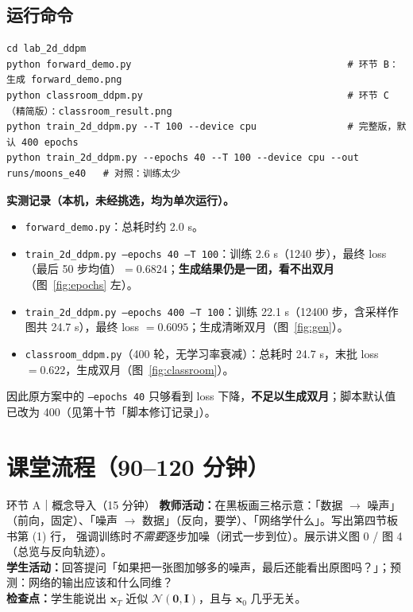 \documentclass[a4paper,fontset=none,zihao=5]{ctexart}
\newcommand{\x}{\mathbf{x}}
\newcommand{\I}{\mathbf{I}}
\newcommand{\N}{\mathcal{N}}
\newcommand{\code}[1]{\texttt{#1}}
\begin{document}
\subsection{运行命令}
\begin{lstlisting}[style=sh]
cd lab_2d_ddpm
python forward_demo.py                                      # 环节 B：生成 forward_demo.png
python classroom_ddpm.py                                    # 环节 C（精简版）：classroom_result.png
python train_2d_ddpm.py --T 100 --device cpu                # 完整版，默认 400 epochs
python train_2d_ddpm.py --epochs 40 --T 100 --device cpu --out runs/moons_e40   # 对照：训练太少
\end{lstlisting}

\begin{notebox}
\textbf{实测记录（本机，未经挑选，均为单次运行）。}
\begin{itemize}[leftmargin=1.4em,itemsep=0pt]
  \item \code{forward\_demo.py}：总耗时约 2.0 s。
  \item \code{train\_2d\_ddpm.py --epochs 40 --T 100}：训练 2.6 s（1240 步），最终 loss（最后 50 步均值）$=0.6824$；\textbf{生成结果仍是一团，看不出双月}（图~\ref{fig:epochs} 左）。
  \item \code{train\_2d\_ddpm.py --epochs 400 --T 100}：训练 22.1 s（12400 步，含采样作图共 24.7 s），最终 loss $=0.6095$；生成清晰双月（图~\ref{fig:gen}）。
  \item \code{classroom\_ddpm.py}（400 轮，无学习率衰减）：总耗时 24.7 s，末批 loss $=0.622$，生成双月（图~\ref{fig:classroom}）。
\end{itemize}
因此原方案中的 \code{--epochs 40} 只够看到 loss 下降，\textbf{不足以生成双月}；脚本默认值已改为 400（见第十节「脚本修订记录」）。
\end{notebox}

\section{课堂流程（90–120 分钟）}

\begin{stepbox}{环节 A｜概念导入（15 分钟）}
\textbf{教师活动：}在黑板画三格示意：「数据 $\to$ 噪声」（前向，固定）、「噪声 $\to$ 数据」（反向，要学）、「网络学什么」。写出第四节板书第 (1) 行，
强调训练时\emph{不需要}逐步加噪（闭式一步到位）。展示讲义图 0 / 图 4（总览与反向轨迹）。\\
\textbf{学生活动：}回答提问「如果把一张图加够多的噪声，最后还能看出原图吗？」；预测：网络的输出应该和什么同维？\\
\textbf{检查点：}学生能说出 $\x_T$ 近似 $\N(\mathbf 0,\I)$，且与 $\x_0$ 几乎无关。
\end{stepbox}
\end{document}
